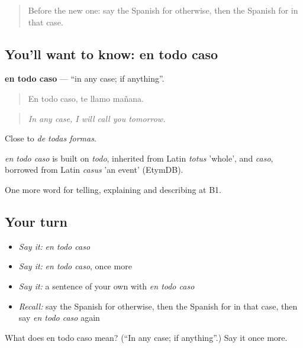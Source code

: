 \label{lesson:ES-C612-en-todo-caso}



\begin{quote}
Before the new one: say the Spanish for otherwise, then the Spanish for in that case.
\end{quote}

\subsection*{You'll want to know: en todo caso}
\textbf{en todo caso} — \textquotedblleft{}in any case; if anything\textquotedblright{}.

\begin{quote}
En todo caso, te llamo mañana.
\end{quote}

\begin{quote}
\emph{In any case, I will call you tomorrow.}
\end{quote}

Close to \emph{de todas formas}.

\begin{cousinweb}
\emph{en todo caso} is built on \emph{todo}, inherited from Latin \emph{totus} 'whole', and \emph{caso}, borrowed from Latin \emph{casus} 'an event' (EtymDB).
\end{cousinweb}

\begin{grammarlens}[title={What you've built}]
One more word for telling, explaining and describing at B1.
\end{grammarlens}

\subsection*{Your turn}
\begin{itemize}
\raggedright
  \item \emph{Say it:} \emph{en todo caso}
  \item \emph{Say it:} \emph{en todo caso}, once more
  \item \emph{Say it:} a sentence of your own with \emph{en todo caso}
  \item \emph{Recall:} say the Spanish for otherwise, then the Spanish for in that case, then say \emph{en todo caso} again
\end{itemize}

\begin{tcolorbox}[breakable,colback=teal!4,colframe=teal!35!black,title={Before you move on}]
What does en todo caso mean? (\textquotedblleft{}In any case; if anything\textquotedblright{}.) Say it once more.
\end{tcolorbox}
